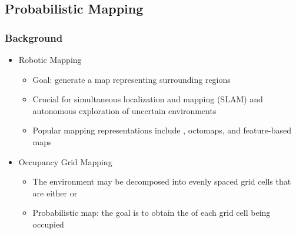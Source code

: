 \documentclass[11pt,professionalfonts,hyperref={pdftex,pdfpagemode=none,pdfstartview=FitH}]{beamer}
\renewcommand{\emph}[1]{\textit{\textbf{\color{blue}{#1}}}}
\begin{document}
\subsection*{Probabilistic Mapping}
\begin{frame}
\frametitle{Background}
	
\begin{itemize}
    \item Robotic Mapping
    \begin{itemize}
    	\item Goal: generate a map representing surrounding regions
	\item Crucial for simultaneous localization and mapping (SLAM) and autonomous exploration of uncertain environments
    	\item Popular mapping representations include \emph{occupancy grids}, octomaps, and feature-based maps
    \end{itemize}
\item Occupancy Grid Mapping
\begin{itemize}
	\item The environment may be decomposed into evenly spaced grid cells that are either \emph{occupied} or \emph{free}
	\item Probabilistic map: the goal is to obtain the \emph{probability} of each grid cell being occupied
\end{itemize}
\end{itemize}


\end{frame}
\end{document}
